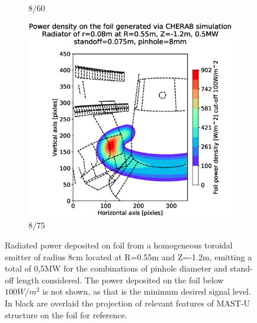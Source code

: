 \begin{figure}[!ht]
\begin{subfigure}{0.32\textwidth}
         \caption{$8/60$}
         \label{fig:8_60}
     \end{subfigure}
     \hfill
     \begin{subfigure}{0.325\textwidth}
         \centering
         \includegraphics[trim={85 25 40 80},clip,width=\textwidth]{Chapters/chapter2/figs/measured_power_8_75radiator_R0.55_Z-1.2_r0.08.stl.eps}
         \caption{$8/75$}
         \label{fig:8_75}
     \end{subfigure}

    \caption{Radiated power deposited on foil from a homogeneous toroidal emitter of radius 8cm located at R=0.55m and Z=-1.2m, emitting a total of 0,5MW for the combinations of pinhole diameter and stand-off length considered. The power deposited on the foil below $100W/m^2$ is not shown, as that is the minimum desired signal level. In black are overlaid the projection of relevant features of MAST-U structure on the foil for reference.}
    \label{fig:cherab1}
\end{figure}

